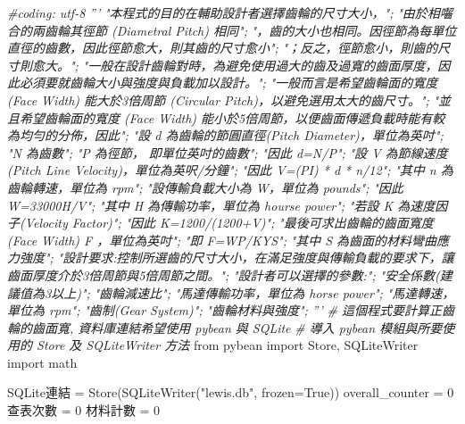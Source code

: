 \documentclass[]{article}
\newenvironment{Shaded}{}{}
\newcommand{\DecValTok}[1]{\textcolor[rgb]{0.25,0.63,0.44}{{#1}}}
\newcommand{\CharTok}[1]{\textcolor[rgb]{0.25,0.44,0.63}{{#1}}}
\newcommand{\StringTok}[1]{\textcolor[rgb]{0.25,0.44,0.63}{{#1}}}
\newcommand{\CommentTok}[1]{\textcolor[rgb]{0.38,0.63,0.69}{\textit{{#1}}}}
\newcommand{\OtherTok}[1]{\textcolor[rgb]{0.00,0.44,0.13}{{#1}}}
\newcommand{\NormalTok}[1]{{#1}}
\begin{document}
\begin{Shaded}
\begin{Highlighting}[]
\CommentTok{#coding: utf-8}
\CommentTok{'''}
\CommentTok{"本程式的目的在輔助設計者選擇齒輪的尺寸大小，";}
\CommentTok{"由於相囓合的兩齒輪其徑節 (Diametral Pitch) 相同";}
\CommentTok{"，齒的大小也相同。因徑節為每單位直徑的齒數，因此徑節愈大，則其齒的尺寸愈小";}
\CommentTok{"；反之，徑節愈小，則齒的尺寸則愈大。";}
\CommentTok{"一般在設計齒輪對時，為避免使用過大的齒及過寬的齒面厚度，因此必須要就齒輪大小與強度與負載加以設計。";}
\CommentTok{"一般而言是希望齒輪面的寬度 (Face Width) 能大於3倍周節 (Circular Pitch)，以避免選用太大的齒尺寸。";}
\CommentTok{"並且希望齒輪面的寬度 (Face Width) 能小於5倍周節，以便齒面傳遞負載時能有較為均勻的分佈，因此";}
\CommentTok{"設 d 為齒輪的節圓直徑(Pitch Diameter)，單位為英吋";}
\CommentTok{"N 為齒數";}
\CommentTok{"P 為徑節， 即單位英吋的齒數";}
\CommentTok{"因此 d=N/P";}
\CommentTok{"設 V 為節線速度(Pitch Line Velocity)，單位為英呎/分鐘";}
\CommentTok{"因此 V=(PI) * d * n/12";}
\CommentTok{"其中 n 為齒輪轉速，單位為 rpm";}
\CommentTok{"設傳輸負載大小為 W，單位為 pounds";}
\CommentTok{"因此 W=33000H/V";}
\CommentTok{"其中 H 為傳輸功率，單位為 hourse power";}
\CommentTok{"若設 K 為速度因子(Velocity Factor)";}
\CommentTok{"因此 K=1200/(1200+V)";}
\CommentTok{"最後可求出齒輪的齒面寬度(Face Width) F ，單位為英吋";}
\CommentTok{"即 F=WP/KYS";}
\CommentTok{"其中 S 為齒面的材料彎曲應力強度";}
\CommentTok{"設計要求:控制所選齒的尺寸大小，在滿足強度與傳輸負載的要求下，讓齒面厚度介於3倍周節與5倍周節之間。";}
\CommentTok{"設計者可以選擇的參數:";}
\CommentTok{"安全係數(建議值為3以上)";}
\CommentTok{"齒輪減速比";}
\CommentTok{"馬達傳輸功率，單位為 horse power";}
\CommentTok{"馬達轉速，單位為 rpm";}
\CommentTok{"齒制(Gear System)";}
\CommentTok{"齒輪材料與強度";}
\CommentTok{'''}
\CommentTok{# 這個程式要計算正齒輪的齒面寬, 資料庫連結希望使用 pybean 與 SQLite}
\CommentTok{# 導入 pybean 模組與所要使用的 Store 及 SQLiteWriter 方法}
\CharTok{from} \NormalTok{pybean }\CharTok{import} \NormalTok{Store, SQLiteWriter}
\CharTok{import} \NormalTok{math}

\NormalTok{SQLite連結 = Store(SQLiteWriter(}\StringTok{"lewis.db"}\NormalTok{, frozen=}\OtherTok{True}\NormalTok{))}
\NormalTok{overall_counter = }\DecValTok{0}
\NormalTok{查表次數 = }\DecValTok{0}
\NormalTok{材料計數 = }\DecValTok{0}


\end{Highlighting}
\end{Shaded}
\end{document}
